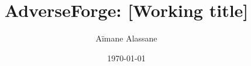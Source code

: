\documentclass{article}
\title{AdverseForge: [Working title]}
\author{Aïmane Alassane}
\date{\today}
\begin{document}
\maketitle

\begin{abstract}

\end{abstract}










\end{document}

